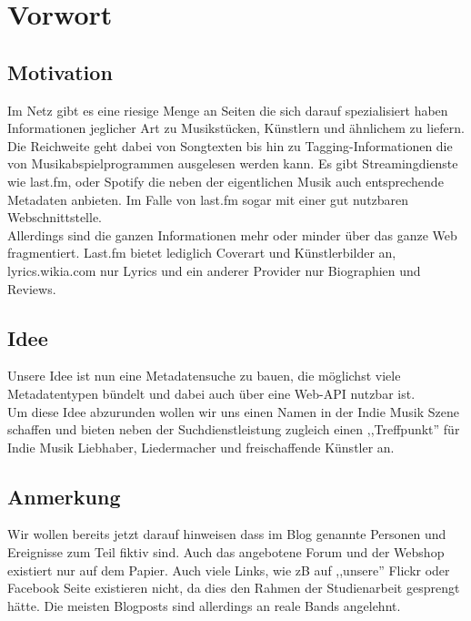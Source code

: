 \chapter{Vorwort}

\section{Motivation}

Im Netz gibt es eine riesige Menge an Seiten die sich darauf spezialisiert
haben Informationen jeglicher Art zu Musikstücken, Künstlern und ähnlichem zu
liefern.
\\
Die Reichweite geht dabei von Songtexten bis hin zu Tagging-Informationen die von
Musikabspielprogrammen ausgelesen werden kann. Es gibt Streamingdienste wie last.fm,
oder Spotify die neben der eigentlichen Musik auch entsprechende Metadaten anbieten. 
Im Falle von last.fm sogar mit einer gut nutzbaren Webschnittstelle.
\\
Allerdings sind die ganzen Informationen mehr oder minder über das ganze Web
fragmentiert. Last.fm bietet lediglich Coverart und Künstlerbilder an, 
lyrics.wikia.com nur Lyrics und ein anderer Provider nur Biographien und
Reviews.
\\
\section{Idee}
Unsere Idee ist nun eine Metadatensuche zu bauen, die möglichst viele
Metadatentypen bündelt und dabei auch über eine Web-API nutzbar ist.
\\
Um diese Idee abzurunden wollen wir uns einen Namen in der Indie Musik Szene
schaffen und bieten neben der Suchdienstleistung zugleich einen ,,Treffpunkt'' für Indie
Musik Liebhaber, Liedermacher und freischaffende Künstler an.

\section{Anmerkung}
Wir wollen bereits jetzt darauf hinweisen dass im Blog genannte Personen und
Ereignisse zum Teil fiktiv sind. Auch das angebotene Forum und der Webshop
existiert nur auf dem Papier. Auch viele Links, wie zB auf ,,unsere'' Flickr
oder Facebook Seite existieren nicht, da dies den Rahmen der Studienarbeit
gesprengt hätte. Die meisten Blogposts sind allerdings an reale
Bands angelehnt.
